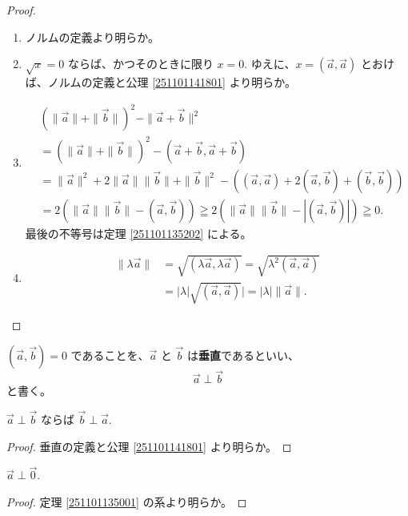 \begin{proof}
  \begin{enumerate}
    \item ノルムの定義より明らか。
    \item \(\sqrt{x}=0\) ならば、かつそのときに限り \(x=0.\)
    ゆえに、\(x=(\vec{a},\vec{a})\) とおけば、ノルムの定義と公理 \ref{251101141801} より明らか。
    \item
      \begin{align*}
        &(\|\vec{a}\|+\|\vec{b}\|)^2-\|\vec{a}+\vec{b}\|^2 \\
        &= (\|\vec{a}\|+\|\vec{b}\|)^2-(\vec{a}+\vec{b},\vec{a}+\vec{b}) \\
        &= \|\vec{a}\|^2+2\|\vec{a}\|\|\vec{b}\|+\|\vec{b}\|^2-((\vec{a},\vec{a})+2(\vec{a},\vec{b})+(\vec{b},\vec{b})) \\
        &= 2(\|\vec{a}\|\|\vec{b}\|-(\vec{a},\vec{b}))\geqq2(\|\vec{a}\|\|\vec{b}\|-|(\vec{a},\vec{b})|)\geqq0.
      \end{align*}
      最後の不等号は定理 \ref{251101135202} による。
    \item
      \begin{align*}
        \|\lambda\vec{a}\| &= \sqrt{(\lambda\vec{a},\lambda\vec{a})}=\sqrt{\lambda^2(\vec{a},\vec{a})} \\
                           &= |\lambda|\sqrt{(\vec{a},\vec{a})}|=|\lambda|\|\vec{a}\|.
      \end{align*}
  \end{enumerate}
\end{proof}

\begin{dfn}[ベクトルの垂直]
  \((\vec{a},\vec{b})=0\) であることを、\(\vec{a}\) と \(\vec{b}\) は\textbf{垂直}であるといい、
  \[\vec{a}\perp\vec{b}\]
  と書く。
\end{dfn}

\begin{thm}
  \(\vec{a}\perp\vec{b}\) ならば \(\vec{b}\perp\vec{a}.\)
\end{thm}

\begin{proof}
  垂直の定義と公理 \ref{251101141801} より明らか。
\end{proof}

\begin{thm}
  \(\vec{a}\perp\vec{0}.\)
\end{thm}

\begin{proof}
  定理 \ref{251101135001} の系より明らか。
\end{proof}

